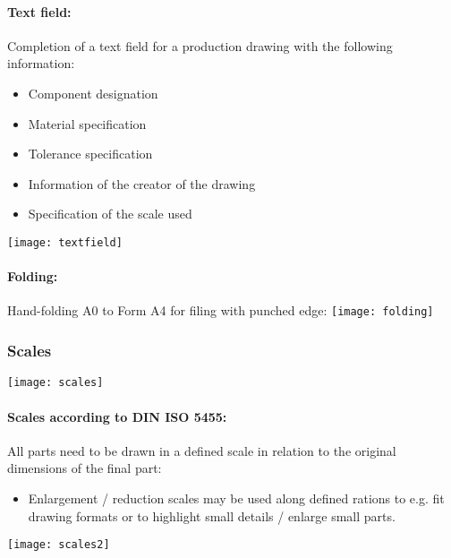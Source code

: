 \documentclass[twocolumn]{article}
\begin{document}
		\paragraph{Text field:}
			Completion of a text field for a production drawing with the following information:
			\begin{itemize}
			\item Component designation
			\item Material specification
			\item Tolerance specification
			\item Information of the creator of the drawing
			\item Specification of the scale used
			\end{itemize}
			\texttt{[image: textfield]}
		\paragraph{Folding:}
			Hand-folding A0 to Form A4 for filing with punched edge:
			\texttt{[image: folding]}
		\subsubsection{Scales}
			\texttt{[image: scales]}
			\paragraph{Scales according to DIN ISO 5455:}
				All parts need to be drawn in a defined scale in relation to the original dimensions of the final part:
				\begin{itemize}
				\item Enlargement / reduction scales may be used along defined rations to e.g. fit drawing formats or to highlight small details / enlarge small parts.
				\end{itemize}
				\texttt{[image: scales2]}
\end{document}
